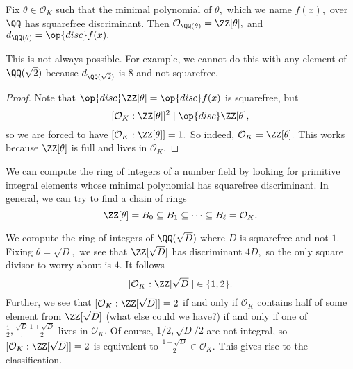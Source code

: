 \begin{cor}
    Fix $\theta\in\mathcal O_K$ such that the minimal polynomial of $\theta,$ which we name $f(x),$ over $\QQ$ has squarefree discriminant. Then $\mathcal O_{\QQ(\theta)}=\ZZ[\theta],$ and $d_{\QQ(\theta)}=\op{disc}f(x).$
\end{cor}
\begin{remark}
    This is not always possible. For example, we cannot do this with any element of $\QQ(\sqrt2)$ because $d_{\QQ(\sqrt2)}$ is $8$ and not squarefree.
\end{remark}
\begin{proof}
    Note that $\op{disc}\ZZ[\theta]=\op{disc}f(x)$ is squarefree, but
    \[[\mathcal O_K:\ZZ[\theta]]^2\mid\op{disc}\ZZ[\theta],\]
    so we are forced to have $[\mathcal O_K:\ZZ[\theta]]=1.$ So indeed, $\mathcal O_K=\ZZ[\theta].$ This works because $\ZZ[\theta]$ is full and lives in $\mathcal O_K.$
\end{proof}
We can compute the ring of integers of a number field by looking for primitive integral elements whose minimal polynomial has squarefree discriminant. In general, we can try to find a chain of rings
\[\ZZ[\theta]=B_0\subseteq B_1\subseteq\cdots\subseteq B_\ell=\mathcal O_K.\]
\begin{ex}
    We compute the ring of integers of $\QQ(\sqrt D)$ where $D$ is squarefree and not $1.$ Fixing $\theta=\sqrt D,$ we see that $\ZZ[\sqrt D]$ has discriminant $4D,$ so the only square divisor to worry about is $4.$ It follows
    \[[\mathcal O_K:\ZZ[\sqrt D]]\in\{1,2\}.\]
    Further, we see that $[\mathcal O_K:\ZZ[\sqrt D]]=2$ if and only if $\mathcal O_K$ contains half of some element from $\ZZ[\sqrt D]$ (what else could we have?) if and only if one of $\frac12,\frac{\sqrt D},\frac{1+\sqrt D}2$ lives in $\mathcal O_K.$ Of course, $1/2,\sqrt D/2$ are not integral, so $[\mathcal O_K:\ZZ[\sqrt D]]=2$ is equivalent to $\frac{1+\sqrt D}2\in\mathcal O_K.$ This gives rise to the classification.
\end{ex}

